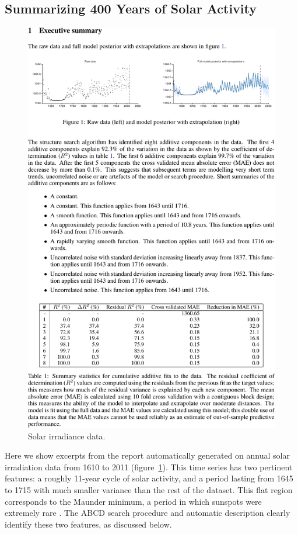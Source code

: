\documentclass[letterpaper]{article}
\let\emptyset 0
\newcommand{\procedurename}{ABCD}
\begin{document}
\subsection{Summarizing 400 Years of Solar Activity}
\label{sec:solar}

\begin{figure}[h]
\centering
\includegraphics[trim=0.2cm 18.0cm 8cm 2cm, clip, width=0.98\columnwidth, height=0.45\columnwidth]{solarpages/pg_0002-crop}
\caption{
Solar irradiance data.}
\label{fig:solar}
\end{figure}

Here we show excerpts from the report automatically generated on annual solar irradiation data from 1610 to 2011 (figure~\ref{fig:solar}).
This time series has two pertinent features: a roughly 11-year cycle of solar activity, and a period lasting from 1645 to 1715 with much smaller variance than the rest of the dataset.  This flat region corresponds to the Maunder minimum, a period in which sunspots were extremely rare \citep{lean1995reconstruction}.
The \procedurename{} search procedure and automatic description clearly identify these two features, as discussed below.

\end{document}
